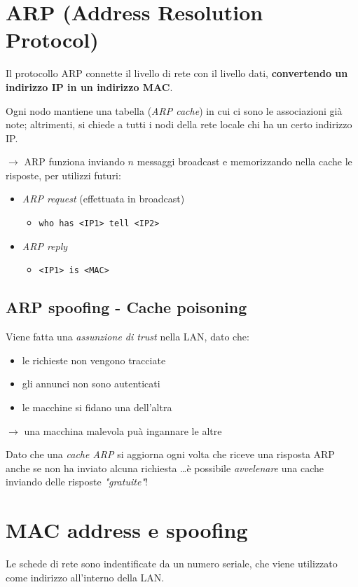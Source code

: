 \newpage
\section{ARP (Address Resolution Protocol)}
Il protocollo ARP connette il livello di rete con il livello dati, \textbf{convertendo un 
indirizzo IP in un indirizzo MAC}.

\noindent Ogni nodo mantiene una tabella (\textit{ARP cache}) in cui ci sono le associazioni 
già note; altrimenti, si chiede a tutti i nodi della rete locale chi ha un certo indirizzo IP.

$\rightarrow$ ARP funziona inviando $n$ messaggi broadcast e memorizzando nella cache le risposte, per utilizzi futuri:
\begin{itemize}
    \item \textit{ARP request} (effettuata in broadcast)
    \begin{itemize}
        \item \texttt{who has <IP1> tell <IP2>} 
    \end{itemize}
    \item \textit{ARP reply}
    \begin{itemize}
        \item \texttt{<IP1> is <MAC>}
    \end{itemize}
\end{itemize}

\subsection{ARP spoofing - Cache poisoning}
Viene fatta una \textit{assunzione di trust} nella LAN, dato che:
\begin{itemize}
    \item le richieste non vengono tracciate 
    \item gli annunci non sono autenticati 
    \item le macchine si fidano una dell'altra 
\end{itemize}

$\rightarrow$ una macchina malevola puà ingannare le altre 

\noindent Dato che una \textit{cache ARP} si aggiorna ogni volta che riceve una risposta ARP anche 
se non ha inviato alcuna richiesta \dots è possibile \textit{avvelenare} una cache inviando delle 
risposte \textit{"gratuite"}!

\section{MAC address e spoofing}
Le schede di rete sono indentificate da un numero seriale, che viene utilizzato come 
indirizzo all'interno della LAN.

